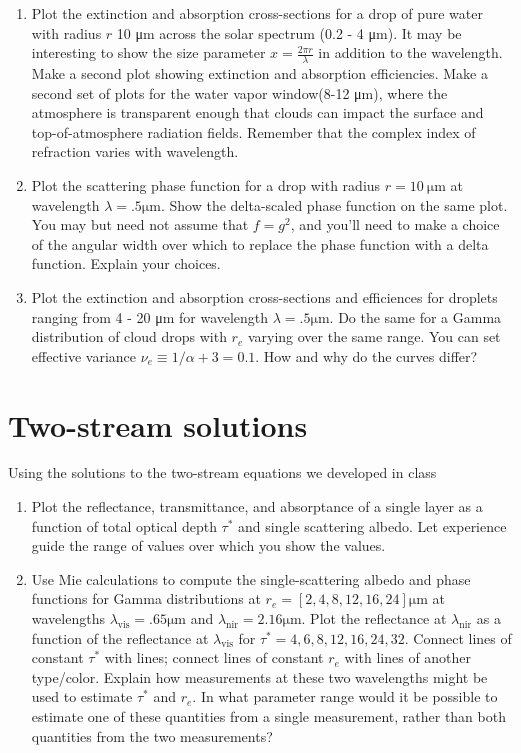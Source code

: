 \documentclass{article}
\begin{document}
\begin{enumerate}

\item Plot the extinction and absorption cross-sections for a drop of pure water with radius $r$ 10 \si{\micro\meter} across the solar spectrum (0.2 - 4 \si{\micro\meter}). It may be interesting to show the size parameter $x = \frac{2 \pi r}{\lambda}$ in addition to the wavelength. Make a second plot showing extinction and absorption efficiencies. Make a second set of plots for the water vapor window(8-12 \si{\micro\meter}), where the atmosphere is transparent enough that clouds can impact the surface and top-of-atmosphere radiation fields. Remember that the complex index of refraction varies with wavelength. 

\item Plot the scattering phase function for a drop with radius $r = 10~\si{\micro\meter}$ at  wavelength $\lambda = .5  \si{\micro\meter}$. Show the delta-scaled phase function on the same plot. You may but need not assume that $f = g^2$, and you'll need to make a choice of the angular width over which to replace the phase function with a delta function. Explain your choices. 

\item Plot the extinction and absorption cross-sections and efficiences for droplets ranging from 4 - 20 \si{\micro\meter} for wavelength $\lambda = .5  \si{\micro\meter}$. Do the same for a Gamma distribution of cloud drops with $r_e$ varying over the same range. You can set effective variance $\nu_e \equiv 1/{\alpha+3} = 0.1.$ How and why do the curves differ? 

\end{enumerate}
\section{Two-stream solutions}

Using the solutions to the two-stream equations we developed in class
\begin{enumerate}
\item Plot the reflectance, transmittance, and absorptance of a single layer as a function of total optical depth $\tau^*$ and single scattering albedo. Let experience guide the range of values over which you show the values. 
\item Use Mie calculations to compute the single-scattering albedo and phase functions for Gamma distributions at $r_e = [2, 4, 8, 12, 16, 24]  \si{\micro\meter}$ at wavelengths $\lambda_{\textrm{vis}} = .65  \si{\micro\meter}$ and $\lambda_{\textrm{nir}} = 2.16  \si{\micro\meter}$. Plot the reflectance at $\lambda_{\textrm{nir}}$ as a function of the reflectance at $\lambda_{\textrm{vis}}$ for $\tau^* = 4, 6, 8, 12, 16, 24, 32$. Connect lines of constant $\tau^*$ with lines; connect lines of constant $r_e$ with lines of another type/color. Explain how measurements at these two wavelengths might be used to estimate $\tau^*$ and $r_e$. In what parameter range would it be possible to estimate one of these quantities from a single measurement, rather than both quantities from the two measurements? 
\end{enumerate}
\end{document}
